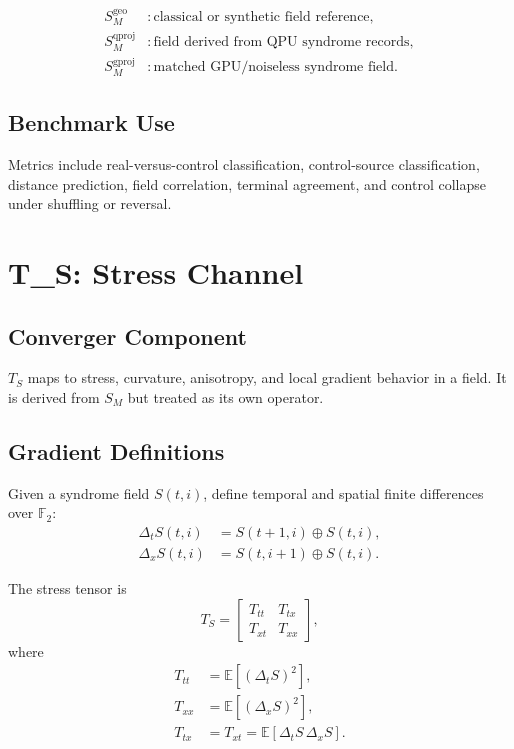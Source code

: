 \documentclass[11pt]{article}
\newcommand{\E}{\mathbb{E}}
\newcommand{\Sm}{S_M}
\newcommand{\Ts}{T_S}
\newcommand{\geo}{\mathrm{geo}}
\newcommand{\qproj}{\mathrm{qproj}}
\newcommand{\gproj}{\mathrm{gproj}}
\begin{document}
\begin{align}
  \Sm^{\geo}   &: \text{classical or synthetic field reference},\\
  \Sm^{\qproj} &: \text{field derived from QPU syndrome records},\\
  \Sm^{\gproj} &: \text{matched GPU/noiseless syndrome field}.
\end{align}

\subsection{Benchmark Use}

Metrics include real-versus-control classification, control-source
classification, distance prediction, field correlation, terminal agreement, and
control collapse under shuffling or reversal.

\section{T\_S: Stress Channel}

\subsection{Converger Component}

\(\Ts\) maps to stress, curvature, anisotropy, and local gradient behavior in a
field. It is derived from \(\Sm\) but treated as its own operator.

\subsection{Gradient Definitions}

Given a syndrome field \(S(t,i)\), define temporal and spatial finite
differences over \(\mathbb{F}_2\):
\begin{align}
  \Delta_t S(t,i) &= S(t+1,i) \oplus S(t,i),\\
  \Delta_x S(t,i) &= S(t,i+1) \oplus S(t,i).
\end{align}

The stress tensor is
\begin{equation}
  \Ts =
  \begin{bmatrix}
    T_{tt} & T_{tx}\\
    T_{xt} & T_{xx}
  \end{bmatrix},
\end{equation}
where
\begin{align}
  T_{tt} &= \E[(\Delta_t S)^2],\\
  T_{xx} &= \E[(\Delta_x S)^2],\\
  T_{tx} &= T_{xt} = \E[\Delta_t S \, \Delta_x S].
\end{align}
\end{document}
